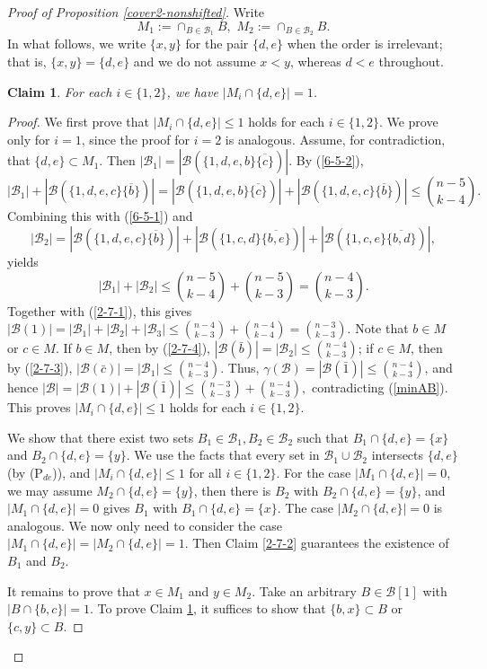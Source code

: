 \documentclass[a4paper,11pt]{article}
\newtheorem{claim}[theorem]{Claim}
\newcommand{\m}{\mathcal}
\begin{document}
\begin{proof}[Proof of Proposition \ref{cover2-nonshifted}]
Write
$$M_1:=\cap_{B\in \m B_1}B, \,\, M_2:=\cap_{B\in \m B_2}B. $$
In what follows, we write $\{x,y\}$ for the pair $\{d,e\}$ when the order is irrelevant; that is, $\{x,y\}=\{d,e\}$ and we do not assume $x<y$, whereas $d<e$ throughout. 

\begin{claim}\label{2-7-5}
   For each $i\in \{1,2\}$, we have $|M_i\cap \{d,e\}|= 1$.
\end{claim}

\begin{proof}
We first prove that $|M_i\cap \{d,e\}|\le 1$ holds for each $i\in \{1,2\}$. We prove only for $i=1$, since the proof for $i=2$ is analogous. 
Assume, for contradiction, that $\{d,e\}\subset M_1$. Then $|\m B_1|=|\m B(\{1,d,e, b\}\overline{\{c\}})|$. 
By (\ref{6-5-2}),
\[
|\m B_1|+|\m B(\{1,d,e, c\}\overline{\{b\}})|=|\m B(\{1,d,e, b\}\overline{\{c\}})|+|\m B(\{1,d,e, c\}\overline{\{b\}})|\le {n-5\choose k-4}.
\]
Combining this with (\ref{6-5-1}) and 
\[
|\m B_2|=|\m B(\{1,d,e, c\}\overline{\{b\}})|+|\m B(\{1, c, d\}\overline{\{b,e\}})|+|\m B(\{1, c,e\}\overline{\{b,d\}})|,
\]
yields
\[
|\m B_1|+|\m B_2|\le {n-5\choose k-4}+{n-5\choose k-3}={n-4\choose k-3}.
\]
Together with (\ref{2-7-1}), this gives 
$
|\m B(1)|=|\m B_1|+|\m B_2|+|\m B_3|\le {n-4\choose k-3}+{n-4\choose k-4}={n-3\choose k-3}.
$
Note that $b\in M$ or $c\in M$. 
If $b\in M$, then by (\ref{2-7-4}), $|\m B(\bar{b})|=|\m B_2|\le {n-4\choose k-3}$;
if $c\in M$, then by (\ref{2-7-3}), $|\m B(\bar{c})|=|\m B_1|\le {n-4\choose k-3}$. 
Thus,
$\gamma(\m B)=|\m B(\bar{1})|\le {n-4\choose k-3}$, and hence $|\m B|=|\m B(1)|+|\m B(\bar{1})|\le {n-3\choose k-3}+{n-4\choose k-3},$ contradicting (\ref{minAB}). 
This proves $|M_i\cap \{d,e\}|\le 1$ holds for each $i\in \{1,2\}$.


We show that there exist two sets $B_1\in \m B_1, B_2\in \m B_2$ such that  $B_1\cap \{d,e\}=\{x\}$ and $B_2\cap \{d,e\}=\{y\}$. 
We use the facts that every set in $\m B_1\cup \m B_2$ intersects $\{d,e\}$ (by (P$_{de}$)), and $|M_i\cap \{d,e\}|\le 1$ for all $i\in \{1,2\}$.
For the case $|M_1\cap \{d,e\}|=0$, we may assume $M_2\cap \{d,e\}=\{y\}$, then there is $B_2$ with $B_2\cap \{d,e\}=\{y\}$, and $|M_1\cap \{d,e\}|=0$ gives $B_1$ with  $B_1\cap \{d,e\}=\{x\}$. The case $|M_2\cap \{d,e\}|=0$ is analogous. 
We now only need to consider the case $|M_1\cap \{d,e\}|=|M_2\cap \{d,e\}|=1$. 
Then Claim \ref{2-7-2} guarantees the existence of $B_1$ and $B_2$. 

It remains to prove that $x\in M_1$ and $y\in M_2$. 
Take an arbitrary $B\in \m B[1]$ with $|B\cap \{b,c\}|=1$. 
To prove Claim \ref{2-7-5}, it suffices to show that $\{b, x\}\subset B$ or $\{c,y\} \subset B$.



\end{proof}
\end{proof}
\end{document}
